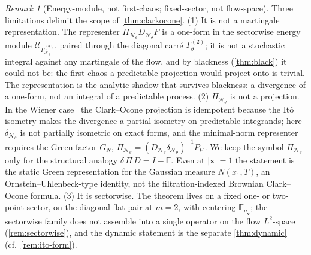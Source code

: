 \documentclass[reqno,final,11pt]{amsart}
\theoremstyle{plain}
\theoremstyle{definition}
\theoremstyle{remark}
\newtheorem{remark}[theorem]{Remark}
\newcommand{\E}{\mathbb E}
\newcommand{\cN}{\mathcal N}
\newcommand{\cU}{\mathcal U}
\newcommand{\GamT}{\Gamma^{(2)}_{\theta}}
\newcommand{\GamN}{\Gamma^{(2)}_{\cN_\theta}}
\newcommand{\DN}{D_{\cN_\theta}}
\newcommand{\divN}{\delta_{\cN_\theta}}
\newcommand{\PiN}{\Pi_{\cN_\theta}}
\begin{document}
\begin{remark}[Energy-module, not first-chaos; fixed-sector, not flow-space]\label{rem:co-not-chaos}
Three limitations delimit the scope of \cref{thm:clarkocone}.
\textnormal{(1)} It is not a martingale representation. The representer
$\PiN\DN F$ is a one-form in the sectorwise energy module $\cU_{\GamN}$, paired
through the diagonal carr\'e $\GamT$; it is not a stochastic integral against any
martingale of the flow, and by blackness (\cref{thm:black}) it could not be: the
first chaos a predictable projection would project onto is trivial. The
representation is the analytic shadow that survives blackness: a divergence of a
one-form, not an integral of a predictable process.
\textnormal{(2)} $\PiN$ is not a projection. In the Wiener
case~\citep{Clark,Ocone,Nualart} the
Clark--Ocone projection is idempotent because the It\^o isometry makes the
divergence a partial isometry on predictable integrands; here $\divN$ is not
partially isometric on exact forms, and the minimal-norm representer requires the
Green factor $G_N$, $\PiN=(\DN\divN)^{-1}P_\nabla$. We keep the symbol $\PiN$
only for the structural analogy $\delta\,\Pi\,D=I-\E$. Even at $|\mathbf x|=1$
the statement is the static Green representation for the Gaussian
measure $N(x_1,T)$, an Ornstein--Uhlenbeck-type identity, not the
filtration-indexed Brownian Clark--Ocone formula.
\textnormal{(3)} It is sectorwise. The theorem lives on a fixed one- or
two-point sector, on the diagonal-flat pair at $m=2$, with centering
$\E_{\mu_{\mathbf x}}$; the sectorwise family does not assemble into a single
operator on the flow $L^2$-space (\cref{rem:sectorwise}), and the dynamic
statement is the separate \cref{thm:dynamic} (cf.\ \cref{rem:ito-form}).
\end{remark}
\end{document}
